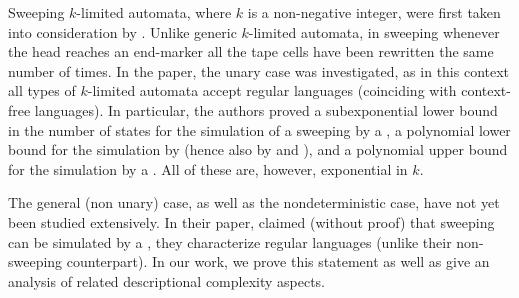 Sweeping $k$-limited automata, where $k$ is a non-negative integer, were first taken into consideration by \citeauthor{KutPig+18} \cite{KutPig+18}.
Unlike generic $k$-limited automata, in sweeping \kLA whenever the head reaches an end-marker all the tape cells have been rewritten the same number of times.
In the paper, the unary case was investigated, as in this context all types of $k$-limited automata accept regular languages (coinciding with context-free languages).
In particular, the authors proved a subexponential lower bound in the number of states for the simulation of a sweeping \kDLA by a \ODFA, a polynomial lower bound for the simulation by \TNFA (hence also by \TDFA and \ONFA), and a polynomial upper bound for the simulation by a \TDFA.
All of these are, however, exponential in $k$.

The general (non unary) case, as well as the nondeterministic case, have not yet been studied extensively.
In their paper, \citeauthor{KutPig+18} claimed (without proof) that sweeping \kLAs can be simulated by a \ONFA, \ie they characterize regular languages (unlike their non-sweeping counterpart).
In our work, we prove this statement as well as give an analysis of related descriptional complexity aspects.
